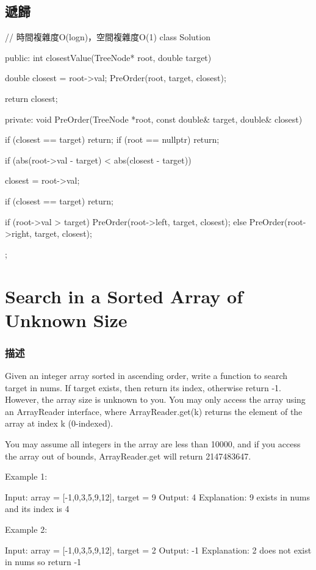 \subsection{遞歸}
\begin{Code}
// 時間複雜度O(logn)，空間複雜度O(1)
class Solution {
public:
    int closestValue(TreeNode* root, double target) {
        double closest = root->val;
        PreOrder(root, target, closest);

        return closest;
    }
private:
    void PreOrder(TreeNode *root, const double& target, double& closest) {
        if (closest == target) return;
        if (root == nullptr) return;

        if (abs(root->val - target) < abs(closest - target)) {
            closest = root->val;

            if (closest == target) return;
        }

        if (root->val > target)
            PreOrder(root->left, target, closest);
        else
            PreOrder(root->right, target, closest);
    }
};
\end{Code}

\section{Search in a Sorted Array of Unknown Size} %
\label{sec:search-in-a-sorted-array-of-unknown-size}


\subsubsection{描述}
Given an integer array sorted in ascending order, write a function to search target in nums.  If target exists, then return its index, otherwise return -1. However, the array size is unknown to you. You may only access the array using an ArrayReader interface, where ArrayReader.get(k) returns the element of the array at index k (0-indexed).

You may assume all integers in the array are less than 10000, and if you access the array out of bounds, ArrayReader.get will return 2147483647.


Example 1:
\begin{Code}
Input: array = [-1,0,3,5,9,12], target = 9
Output: 4
Explanation: 9 exists in nums and its index is 4
\end{Code}

Example 2:
\begin{Code}
Input: array = [-1,0,3,5,9,12], target = 2
Output: -1
Explanation: 2 does not exist in nums so return -1
\end{Code}

